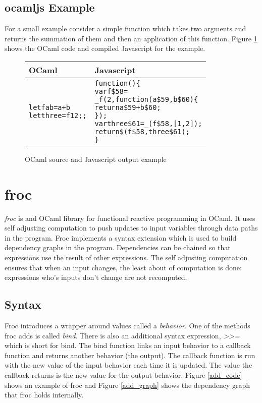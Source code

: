 \subsection{ocamljs Example}
For a small example consider a simple function which takes two argments and returns the summation of them and then an application of this function. Figure \ref{example} shows the OCaml code and compiled Javascript for the example.

\begin{figure}
  \begin{tabular}{| p{3.5cm} | p{8cm} |}
    \hline
    \textbf{OCaml} & \textbf{Javascript}\\ \hline
    \begin{alltt}
let f a b = a+b
let three = f 1 2;;
    \end{alltt}
    &
    \begin{alltt}
function () \{
  var f\$58 =
    _f(2, function (a\$59, b\$60) \{
      return a\$59 + b\$60;
    \});
  var three\$61 = _(f\$58, [ 1, 2 ]);
  return \$(f\$58, three\$61);
\}
    \end{alltt} \\ \hline
  \end{tabular}
  \caption{OCaml source and Javascript output example}
  \label{example}
\end{figure}

\section{froc}

\emph{froc} is and OCaml library for functional reactive programming in OCaml. It uses self adjusting computation to push updates to input variables through data paths in the program. Froc implements a syntax extension which is used to build dependency graphs in the program. Dependencies can be chained so that expressions use the result of other expressions. The self adjusting computation ensures that when an input changes, the least about of computation is done: expressions who's inputs don't change are not recomputed.

\subsection{Syntax}
Froc introduces a wrapper around values called a \emph{behavior}. One of the methods froc adds is called \emph{bind}. There is also an additional syntax expression, \emph{>>=} which is short for bind. The bind function links an input behavior to a callback function and returns another behavior (the output). The callback function is run with the new value of the input behavior each time it is updated. The value the callback returns is the new value for the output behavior. Figure \ref{add_code} shows an example of froc and Figure \ref{add_graph} shows the dependency graph that froc holds internally.

